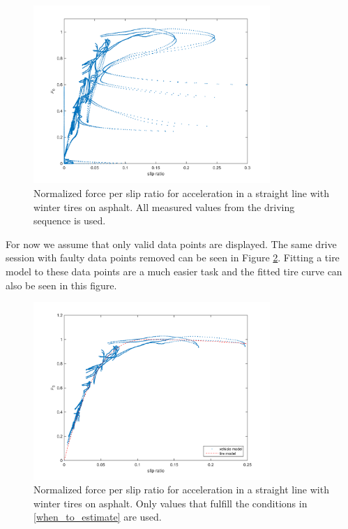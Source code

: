 \begin{figure}[h]
	\centering
	\includegraphics[width=0.8\textwidth]{Pictures/slip_kraft_olika_acc_uncensored}
	\caption {Normalized force per slip ratio for acceleration in a straight line with winter tires on asphalt. All measured values from the driving sequence is used.}
	\label{slip_kraft_olika_acc_uncensored}
\end{figure}

For now we assume that only valid data points are displayed. The same drive session with faulty data points removed can be seen in Figure \ref{slip_kraft_ljungby}. Fitting a tire model to these data points are a much easier task and the fitted tire curve can also be seen in this figure.

\begin{figure}[h]
	\centering
	\includegraphics[width=0.8\textwidth]{Pictures/slip_kraft_ljungby}
	\caption {Normalized force per slip ratio for acceleration in a straight line with winter tires on asphalt. Only values that fulfill the conditions in \ref{when_to_estimate} are used.}
	\label{slip_kraft_ljungby}
\end{figure}

